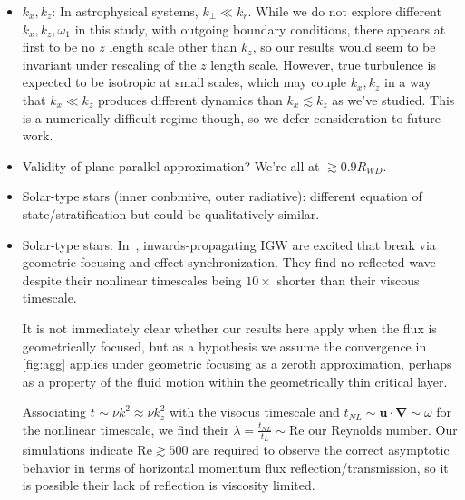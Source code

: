 \documentclass[
        fleqn,
        usenatbib,
    ]{mnras}
\newcommand*{\bm}[1]{\mathbf{#1}}
\begin{document}
\begin{itemize}
    \item $k_x, k_z$: In astrophysical systems, $k_{\perp} \ll k_r$. While we do
        not explore different $k_{x}, k_{z}, \omega_1$ in this study, with
        outgoing boundary conditions, there appears at first to be no $z$ length
        scale other than $k_{z}$, so our results would seem to be invariant
        under rescaling of the $z$ length scale. However, true turbulence is
        expected to be isotropic at small scales, which may couple $k_{x},
        k_{z}$ in a way that $k_{x} \ll k_{z}$ produces different dynamics
        than $k_{x} \lesssim k_{z}$ as we've studied. This is a numerically
        difficult regime though, so we defer consideration to future work.

    \item Validity of plane-parallel approximation? We're all at $\gtrsim
        0.9R_{WD}$.

    \item Solar-type stars (inner conbmtive, outer radiative): different
        equation of state/stratification but could be qualitatively similar.

    \item Solar-type stars: In~\cite{barker_ogilvie}, inwards-propagating IGW
        are excited that break via geometric focusing and effect
        synchronization. They find no reflected wave despite their nonlinear
        timescales being $10\times$ shorter than their viscous timescale.

        It is not immediately clear whether our results here apply when the flux
        is geometrically focused, but as a hypothesis we assume the convergence
        in \autoref{fig:agg} applies under geometric focusing as a zeroth
        approximation, perhaps as a property of the fluid motion within the
        geometrically thin critical layer.

        Associating $t_{} \sim \nu k^2 \approx \nu k_z^2$ with the visocus
        timescale and $t_{NL} \sim \bm{u} \cdot \bm{\nabla} \sim \omega$ for
        the nonlinear timescale, we find their $\lambda = \frac{t_{NL}}{t_L}
        \sim \mathrm{Re}$ our Reynolds number. Our simulations indicate
        $\mathrm{Re} \gtrsim 500$ are required to observe the correct asymptotic
        behavior in terms of horizontal momentum flux reflection/transmission,
        so it is possible their lack of reflection is viscosity limited.
\end{itemize}
\end{document}

